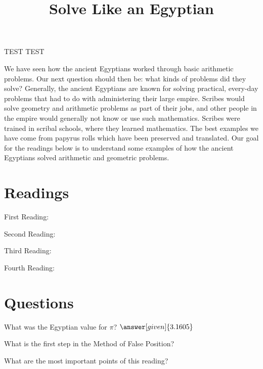 \documentclass{ximera}
\title{Solve Like an Egyptian}
\begin{document}
\begin{abstract}
\end{abstract}
\maketitle


TEST TEST


We have seen how the ancient Egyptians worked through basic arithmetic problems.  Our next question should then be: what kinds of problems did they solve?  Generally, the ancient Egyptians are known for solving practical, every-day problems that had to do with administering their large empire.  Scribes would solve geometry and arithmetic problems as part of their jobs, and other people in the empire would generally not know or use such mathematics.  Scribes were trained in scribal schools, where they learned mathematics.  The best examples we have come from papyrus rolls which have been preserved and translated.  Our goal for the readings below is to understand some examples of how the ancient Egyptians solved arithmetic and geometric problems.



\section{Readings}

First Reading: 

Second Reading: 

Third Reading: 

Fourth Reading: 


\section{Questions}

\begin{question}
What was the Egyptian value for $\pi$? $\answer[given]{3.1605}$
\end{question}

\begin{question}
What is the first step in the Method of False Position?
\begin{multipleChoice}
\end{multipleChoice}
\end{question}


\begin{question}
What are the most important points of this reading?
\begin{freeResponse}
\end{freeResponse}
\end{question}
\end{document}

